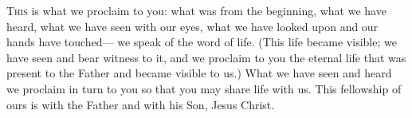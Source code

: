 \lettrine[lines=3,loversize=0.15]{T}{his} is what we proclaim to you:
what was from the beginning,
what we have heard,
what we have seen with our eyes,
what we have looked upon
and our hands have touched—
we speak of the word of life.
(This life became visible; we have seen and bear witness to it, and we proclaim to you the eternal life that was present to the Father and became visible to us.)
What we have seen and heard
we proclaim in turn to you
so that you may share life with us.
This fellowship of ours is with the Father
and with his Son, Jesus Christ.
